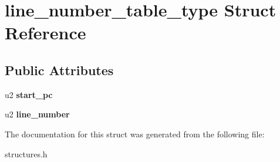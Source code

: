 \hypertarget{structline__number__table__type}{}\section{line\+\_\+number\+\_\+table\+\_\+type Struct Reference}
\label{structline__number__table__type}
\subsection*{Public Attributes}
\begin{DoxyCompactItemize}
\item 
u2 {\bfseries start\+\_\+pc}\hypertarget{structline__number__table__type_ac0e263d3f0484fb8bea365e8b87398e1}{}\label{structline__number__table__type_ac0e263d3f0484fb8bea365e8b87398e1}

\item 
u2 {\bfseries line\+\_\+number}\hypertarget{structline__number__table__type_ac9f2fe3d86343b8eb013f969fa31314c}{}\label{structline__number__table__type_ac9f2fe3d86343b8eb013f969fa31314c}

\end{DoxyCompactItemize}


The documentation for this struct was generated from the following file\+:\begin{DoxyCompactItemize}
\item 
structures.\+h\end{DoxyCompactItemize}
